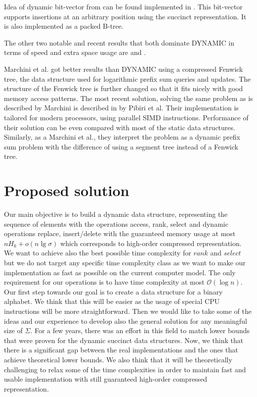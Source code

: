 Idea of dynamic bit-vector from \cite{policriti2015average} can be found implemented in \cite{ds-bitvector}. This bit-vector supports insertions at an arbitrary position using the succinct representation. It is also implemented as a packed B-tree.

The other two notable and recent results that both dominate DYNAMIC in terms of speed and extra space usage are \cite{marchini2020compact} and \cite{pibiri2020rank}.

Marchini et al. got better results than DYNAMIC using a compressed Fenwick tree\cite{marchini2020compact}, the data structure used for logarithmic prefix sum queries and updates\cite{fenwick1994new}. The structure of the Fenwick tree is further changed so that it fits nicely with good memory access patterns. The most recent solution, solving the same problem as is described by Marchini is described in \cite{pibiri2020rank} by Pibiri et al. Their implementation is tailored for modern processors, using parallel SIMD instructions. Performance of their solution can be even compared with most of the static data structures. Similarly, as a Marchini et al., they interpret the problem as a dynamic prefix sum problem with the difference of using a segment tree instead of a Fenwick tree.

\section{Proposed solution}

Our main objective is to build a dynamic data structure, representing the sequence of elements with the operations access, rank, select and dynamic operations replace, insert/delete with the guaranteed memory usage at most $nH_k+o(n\lg\sigma)$ which corresponds to high-order compressed representation. We want to achieve also the best possible time complexity for $rank$ and $select$ but we do not target any specific time complexity class as we want to make our implementation as fast as possible on the current computer model. The only requirement for our operations is to have time complexity at most $\mathcal{O}(\log n)$. Our first step towards our goal is to create a data structure for a binary alphabet. We think that this will be easier as the usage of special CPU instructions will be more straightforward. Then we would like to take some of the ideas and our experience to develop also the general solution for any meaningful size of $\Sigma$. For a few years, there was an effort in this field to match lower bounds that were proven for the dynamic succinct data structures. Now, we think that there is a significant gap between the real implementations and the ones that achieve theoretical lower bounds. We also think that it will be theoretically challenging to relax some of the time complexities in order to maintain fast and usable implementation with still guaranteed high-order compressed representation.
